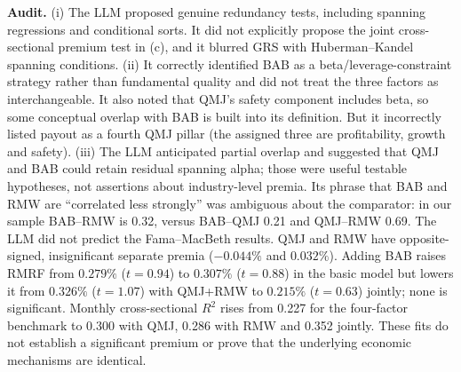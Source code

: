 \noindent\textbf{Audit.} (i) The LLM proposed genuine redundancy tests, including
spanning regressions and conditional sorts. It did not explicitly propose the
joint cross-sectional premium test in (c), and it blurred GRS with
Huberman--Kandel spanning conditions.
(ii) It correctly identified BAB as a beta/leverage-constraint strategy rather
than fundamental quality and did not treat the three factors as interchangeable.
It also noted that QMJ's safety component includes beta, so some conceptual
overlap with BAB is built into its definition. But it incorrectly listed payout
as a fourth QMJ pillar (the assigned three are profitability, growth and safety).
(iii) The LLM anticipated partial overlap and suggested that QMJ and BAB
could retain residual spanning alpha; those were useful testable hypotheses,
not assertions about industry-level premia. Its phrase that BAB and RMW
are ``correlated less strongly'' was ambiguous about the comparator: in our
sample BAB--RMW is 0.32, versus BAB--QMJ 0.21 and QMJ--RMW 0.69.
The LLM did not predict the Fama--MacBeth results. QMJ and RMW have opposite-
signed, insignificant separate premia ($-0.044\%$ and $0.032\%$). Adding BAB
raises RMRF from $0.279\%$ ($t=0.94$) to $0.307\%$ ($t=0.88$) in the basic
model but lowers it from $0.326\%$ ($t=1.07$) with QMJ+RMW to $0.215\%$
($t=0.63$) jointly; none is significant. Monthly cross-sectional $R^2$ rises
from 0.227 for the four-factor benchmark to 0.300 with QMJ, 0.286 with RMW
and 0.352 jointly. These fits do not establish a significant premium or prove
that the underlying economic mechanisms are identical.
